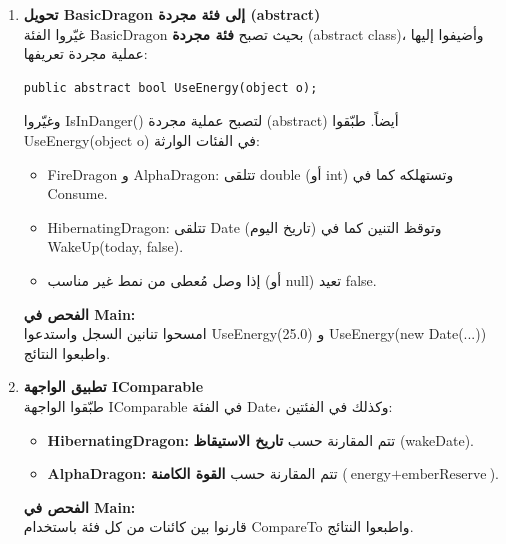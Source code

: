 \documentclass[14pt]{extarticle}
\begin{document}
\begin{enumerate}[label=\textbf{تمرين \arabic*:}, wide=0pt, leftmargin=*, itemsep=2.2em]

    \item \textbf{تحويل \textenglish{BasicDragon} إلى فئة مجردة (\textenglish{abstract})} \\
    غيّروا الفئة \textenglish{BasicDragon} بحيث تصبح \textbf{فئة مجردة} (\textenglish{abstract class})، وأضيفوا إليها عملية مجردة تعريفها:
    \begin{boxCode}
    \begin{english}
    \begin{verbatim}
public abstract bool UseEnergy(object o);
    \end{verbatim}
    \end{english}
    \end{boxCode}
    وغيّروا \textenglish{IsInDanger()} لتصبح عملية مجردة (\textenglish{abstract}) أيضاً. طبّقوا \textenglish{UseEnergy(object o)} في الفئات الوارثة:
    \begin{itemize}
        \item \textenglish{FireDragon} و \textenglish{AlphaDragon}: تتلقى \textenglish{double} (أو \textenglish{int}) وتستهلكه كما في \textenglish{Consume}.
        \item \textenglish{HibernatingDragon}: تتلقى \textenglish{Date} (تاريخ اليوم) وتوقظ التنين كما في \textenglish{WakeUp(today, false)}.
        \item إذا وصل مُعطى من نمط غير مناسب (أو \textenglish{null}) تعيد \textenglish{false}.
    \end{itemize}
    \textbf{الفحص في \textenglish{Main}:} \\
    امسحوا تنانين السجل واستدعوا \textenglish{UseEnergy(25.0)} و \textenglish{UseEnergy(new Date(...))} واطبعوا النتائج.

    \item \textbf{تطبيق الواجهة \textenglish{IComparable}} \\
    طبّقوا الواجهة \textenglish{IComparable} في الفئة \textenglish{Date}، وكذلك في الفئتين:
    \begin{itemize}
        \item \textbf{\textenglish{HibernatingDragon}:} تتم المقارنة حسب \textbf{تاريخ الاستيقاظ} (\textenglish{wakeDate}).
        \item \textbf{\textenglish{AlphaDragon}:} تتم المقارنة حسب \textbf{القوة الكامنة} ($\text{energy} + \text{emberReserve}$).
    \end{itemize}
    \textbf{الفحص في \textenglish{Main}:} \\
    قارنوا بين كائنات من كل فئة باستخدام \textenglish{CompareTo} واطبعوا النتائج.


\end{enumerate}
\end{document}
